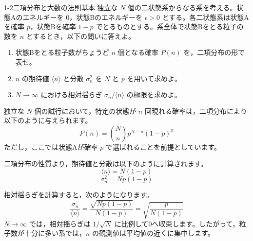 
\begin{mondai}{1-2}{二項分布と大数の法則}{基本}
独立な $N$ 個の二状態系からなる系を考える。状態Aのエネルギーを 0，状態Bのエネルギーを $\epsilon > 0$ とする。各二状態系は状態Aを確率 $p$，状態Bを確率 $1-p$ でとるものとする。系全体で状態Bをとる粒子の数を $n$ とするとき，以下の問いに答えよ。

\begin{enumerate}
  \item 状態Bをとる粒子数がちょうど $n$ 個となる確率 $P(n)$ を，二項分布の形で表せ。

  \item $n$ の期待値 $\langle n \rangle$ と分散 $\sigma_n^2$ を $N$ と $p$ を用いて求めよ。

  \item $N\to\infty$ における相対揺らぎ $\sigma_n / \langle n \rangle$ の極限を求めよ。
\end{enumerate}
\end{mondai}

\solutionheading
\begin{solutionparts}

独立な $N$ 個の試行において，特定の状態が $n$ 回現れる確率は，二項分布により以下のように与えられます。
\begin{equation*}
P(n) = \binom{N}{n} p^{N-n} (1-p)^n
\end{equation*}
ただし，ここでは状態Aが確率 $p$ で選ばれることを前提としています。

二項分布の性質より，期待値と分散は以下のように計算されます。
\begin{equation*}
\langle n \rangle = N(1-p)
\end{equation*}
\begin{equation*}
\sigma_n^2 = Np(1-p)
\end{equation*}

相対揺らぎを計算すると，次のようになります。
\begin{equation*}
\frac{\sigma_n}{\langle n \rangle} = \frac{\sqrt{Np(1-p)}}{N(1-p)} = \sqrt{\frac{p}{N(1-p)}}
\end{equation*}
$N \to \infty$ では，相対揺らぎは $1/\sqrt{N}$ に比例して0へ収束します。したがって，粒子数が十分に多い系では，$n$ の観測値は平均値の近くに集中します。

\end{solutionparts}
